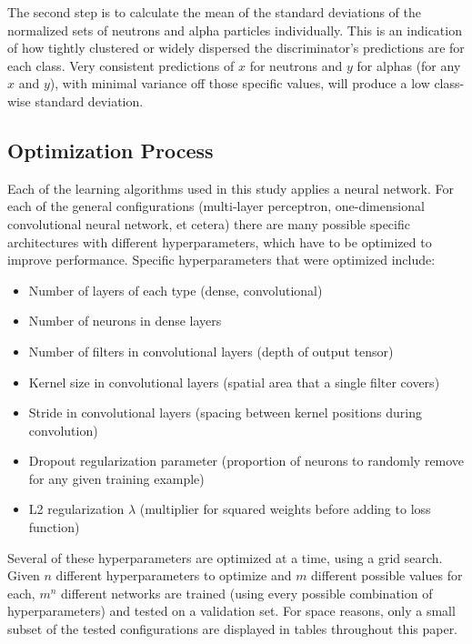\documentclass[10pt]{article}
\begin{document}
The second step is to calculate the mean of the standard deviations of the normalized sets of neutrons and alpha particles individually. This is an indication of how tightly clustered or widely dispersed the discriminator’s predictions are for each class. Very consistent predictions of $x$ for neutrons and $y$ for alphas (for any $x$ and $y$), with minimal variance off those specific values, will produce a low class-wise standard deviation.

\subsection{Optimization Process}

Each of the learning algorithms used in this study applies a neural network. For each of the general configurations (multi-layer perceptron, one-dimensional convolutional neural network, et cetera) there are many possible specific architectures with different hyperparameters, which have to be optimized to improve performance. Specific hyperparameters that were optimized include:

\begin{itemize}
    \item Number of layers of each type (dense, convolutional)
    \item Number of neurons in dense layers
    \item Number of filters in convolutional layers (depth of output tensor)
    \item Kernel size in convolutional layers (spatial area that a single filter covers)
    \item Stride in convolutional layers (spacing between kernel positions during convolution)
    \item Dropout regularization parameter (proportion of neurons to randomly remove for any given training example)
    \item L2 regularization $\lambda$ (multiplier for squared weights before adding to loss function)
\end{itemize}


Several of these hyperparameters are optimized at a time, using a grid search. Given $n$ different hyperparameters to optimize and $m$ different possible values for each, $m^n$ different networks are trained (using every possible combination of hyperparameters) and tested on a validation set. For space reasons, only a small subset of the tested configurations are displayed in tables throughout this paper.
\end{document}
